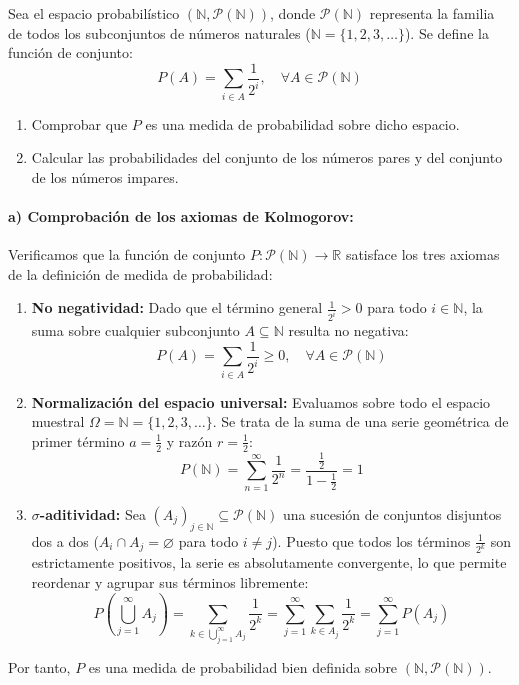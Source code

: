 \begin{problema}
Sea el espacio probabilístico $(\mathbb{N}, \mathcal{P}(\mathbb{N}))$, donde $\mathcal{P}(\mathbb{N})$ representa la familia de todos los subconjuntos de números naturales ($\mathbb{N} = \{1, 2, 3, \dots\}$). Se define la función de conjunto:
\[
    P(A) = \sum_{i \in A} \frac{1}{2^i}, \quad \forall A \in \mathcal{P}(\mathbb{N})
\]
\begin{enumerate}[label=\alph*)]
    \item Comprobar que $P$ es una medida de probabilidad sobre dicho espacio.
    \item Calcular las probabilidades del conjunto de los números pares y del conjunto de los números impares.
\end{enumerate}

\tcblower

\paragraph{a) Comprobación de los axiomas de Kolmogorov:}
Verificamos que la función de conjunto $P : \mathcal{P}(\mathbb{N}) \to \mathbb{R}$ satisface los tres axiomas de la definición de medida de probabilidad:
\begin{enumerate}[label=\arabic*.]
    \item \textbf{No negatividad:} Dado que el término general $\frac{1}{2^i} > 0$ para todo $i \in \mathbb{N}$, la suma sobre cualquier subconjunto $A \subseteq \mathbb{N}$ resulta no negativa:
    \[
        P(A) = \sum_{i \in A} \frac{1}{2^i} \ge 0, \quad \forall A \in \mathcal{P}(\mathbb{N})
    \]
    \item \textbf{Normalización del espacio universal:} Evaluamos sobre todo el espacio muestral $\Omega = \mathbb{N} = \{1, 2, 3, \dots\}$. Se trata de la suma de una serie geométrica de primer término $a = \frac{1}{2}$ y razón $r = \frac{1}{2}$:
    \[
        P(\mathbb{N}) = \sum_{n=1}^\infty \frac{1}{2^n} = \frac{\frac{1}{2}}{1 - \frac{1}{2}} = 1
    \]
    \item \textbf{$\sigma$-aditividad:} Sea $(A_j)_{j \in \mathbb{N}} \subseteq \mathcal{P}(\mathbb{N})$ una sucesión de conjuntos disjuntos dos a dos ($A_i \cap A_j = \varnothing$ para todo $i \neq j$). Puesto que todos los términos $\frac{1}{2^k}$ son estrictamente positivos, la serie es absolutamente convergente, lo que permite reordenar y agrupar sus términos libremente:
    \[
        P\left( \bigcup_{j=1}^\infty A_j \right) = \sum_{k \in \bigcup_{j=1}^\infty A_j} \frac{1}{2^k} = \sum_{j=1}^\infty \sum_{k \in A_j} \frac{1}{2^k} = \sum_{j=1}^\infty P(A_j)
    \]
\end{enumerate}
Por tanto, $P$ es una medida de probabilidad bien definida sobre $(\mathbb{N}, \mathcal{P}(\mathbb{N}))$.


\end{problema}
